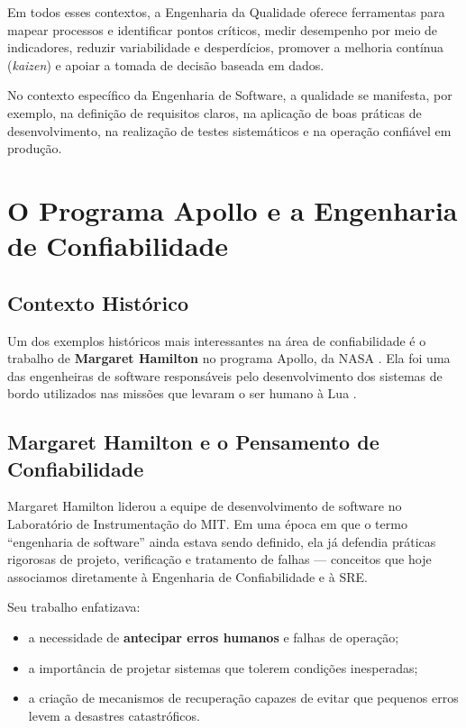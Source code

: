 \documentclass[12pt,a4paper]{report}
\begin{document}
Em todos esses contextos, a Engenharia da Qualidade oferece ferramentas para
mapear processos e identificar pontos críticos, medir desempenho por meio de
indicadores, reduzir variabilidade e desperdícios, promover a melhoria contínua
(\emph{kaizen}) e apoiar a tomada de decisão baseada em dados.

No contexto específico da Engenharia de Software, a qualidade se manifesta,
por exemplo, na definição de requisitos claros, na aplicação de boas práticas
de desenvolvimento, na realização de testes sistemáticos e na operação
confiável em produção.


\section{O Programa Apollo e a Engenharia de Confiabilidade}

\subsection{Contexto Histórico}

Um dos exemplos históricos mais interessantes na área de confiabilidade é o
trabalho de \textbf{Margaret Hamilton} no programa Apollo, da NASA \cite{hamilton1976apollo, fisher2019moon}. Ela foi
uma das engenheiras de software responsáveis pelo desenvolvimento dos sistemas
de bordo utilizados nas missões que levaram o ser humano à Lua \cite{garman2011apollo}.

\subsection{Margaret Hamilton e o Pensamento de Confiabilidade}

Margaret Hamilton liderou a equipe de desenvolvimento de software no
Laboratório de Instrumentação do MIT. Em uma época em que o termo
``engenharia de software'' ainda estava sendo definido, ela já defendia
práticas rigorosas de projeto, verificação e tratamento de falhas --- conceitos
que hoje associamos diretamente à Engenharia de Confiabilidade e à SRE.

Seu trabalho enfatizava:
\begin{itemize}[nosep]
    \item a necessidade de \textbf{antecipar erros humanos} e falhas de
    operação;
    \item a importância de projetar sistemas que tolerem condições inesperadas;
    \item a criação de mecanismos de recuperação capazes de evitar que
    pequenos erros levem a desastres catastróficos.
\end{itemize}
\end{document}
